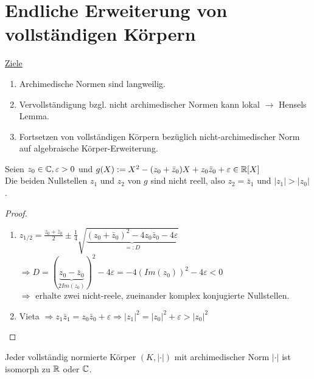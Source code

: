 
\section{Endliche Erweiterung von vollständigen Körpern}
\underline{Ziele}
\begin{enumerate}[(1)]
\item Archimedische Normen sind langweilig.
\item Vervollständigung bzgl. nicht archimedischer Normen \glqq kann lokal \grqq $\rightarrow$ Hensels Lemma.
\item Fortsetzen von vollständigen Körpern bezüglich nicht-archimedischer Norm auf algebraische Körper-Erweiterung.
\end{enumerate}

\begin{Lem}
Seien $z_0 \in \mathbb{C}, \varepsilon >0$ und $g(X):=X^2-(z_0+\bar{z}_0)X +z_0 \bar{z}_0 + \varepsilon \in \mathbb{R}[X]$\\
Die beiden Nullstellen $z_1$ und $z_2$ von $g$ sind nicht reell, also $z_2=\bar{z}_1$ und $|z_1|>|z_0|$.
\end{Lem}

\begin{proof}
\begin{enumerate}[(1)]
\item $z_{1/2} = \frac{z_0 + \bar{z}_0}{2}\pm \frac{1}{4} \sqrt{\underbrace{(z_0+\bar{z}_0)^2-4z_0 \bar{z}_0 -4\varepsilon}_{=:D}}$\\
$\Rightarrow D=(\underbrace{z_0-\bar{z}_0}_{2Im(z_0)})^2-4\varepsilon=-4(Im(z_0))^2 - 4 \varepsilon <0$\\
$\Rightarrow$ erhalte zwei nicht-reele, zueinander komplex konjugierte Nullstellen.
\item Vieta $\Rightarrow z_1\bar{z}_1=z_0\bar{z}_0 + \varepsilon \Rightarrow |z_1|^2=|z_0|^2+\varepsilon>|z_0|^2$
\end{enumerate}
\end{proof}

\begin{Satz}
Jeder vollständig normierte Körper $(K, |\cdot|)$ mit archimedischer Norm $|\cdot|$ ist isomorph zu $\mathbb{R}$ oder $\mathbb{C}$.
\end{Satz}

